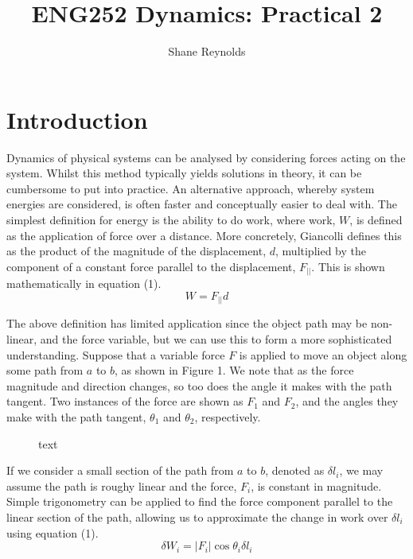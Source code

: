 \documentclass[a4paper]{article}
\begin{document}
\title{ENG252 Dynamics: Practical 2}
\author{Shane Reynolds}
\maketitle

\section{Introduction}
Dynamics of physical systems can be analysed by considering forces acting on the system. Whilst this method typically yields solutions in theory, it can be cumbersome to put into practice. An alternative approach, whereby system energies are considered, is often faster and conceptually easier to deal with. The simplest definition for energy is the ability to do work, where work, $W$, is defined as the application of force over a distance. More concretely, Giancolli defines this as the product of the magnitude of the displacement, $d$, multiplied by the component of a constant force parallel to the displacement, $F_{||}$. This is shown mathematically in equation (1).
\begin{equation}
W = F_{||}d
\end{equation}

The above definition has limited application since the object path may be non-linear, and the force variable, but we can use this to form a more sophisticated understanding. Suppose that a variable force $F$ is applied to move an object along some path from $a$ to $b$, as shown in Figure 1. We note that as the force magnitude and direction changes, so too does the angle it makes with the path tangent. Two instances of the force are shown as $F_1$ and $F_2$, and the angles they make with the path tangent, $\theta_1$ and $\theta_2$, respectively.
\begin{figure}[h]
	\centering
	\caption{text}
\end{figure}

If we consider a small section of the path from $a$ to $b$, denoted as $\delta l_i$, we may assume the path is roughy linear and the force, $F_i$, is constant in magnitude. Simple trigonometry can be applied to find the force component parallel to the linear section of the path, allowing us to approximate the change in work over $\delta l_i$ using equation (1).
\begin{equation}
\delta W_i = |F_i| \cos\theta_i \delta l_i
\end{equation}
\end{document}
